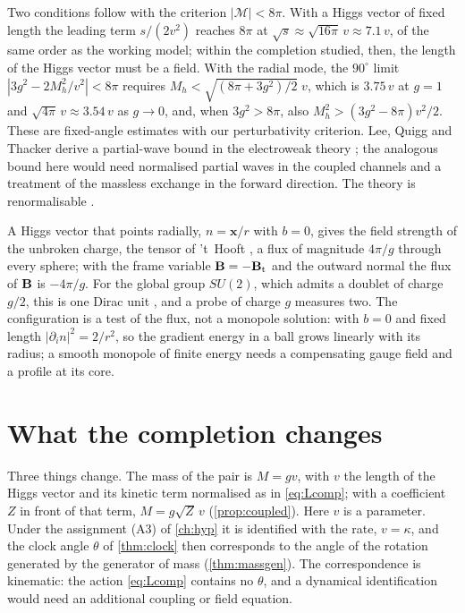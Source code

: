Two conditions follow with the criterion $|\mathcal M|<8\pi$. With a Higgs vector of fixed length the leading term $s/(2v^2)$ reaches $8\pi$
at $\sqrt s\approx\sqrt{16\pi}\,v\approx7.1\,v$, of the same order as the working model; within the completion studied, then, the length of the Higgs vector must be a field. With the
radial mode, the $90^\circ$ limit $|3g^2-2M_h^2/v^2|<8\pi$ requires $M_h<\sqrt{(8\pi+3g^2)/2}\;v$, which is $3.75\,v$ at $g=1$ and
$\sqrt{4\pi}\,v\approx3.54\,v$ as $g\to0$, and, when $3g^2>8\pi$, also $M_h^2>(3g^2-8\pi)v^2/2$. These are fixed-angle estimates with our
perturbativity criterion. Lee, Quigg and Thacker derive a partial-wave bound in the electroweak theory \cite{LeeQuiggThacker77}; the
analogous bound here would need normalised partial waves in the coupled channels and a treatment of the massless exchange in the forward
direction. The theory is renormalisable \cite{tHooft71}.

A Higgs vector that points radially, $n=\mathbf x/r$ with $b=0$, gives the field strength of the unbroken charge, the tensor of 't~Hooft
\cite{tHooft74,Polyakov74}, a flux of magnitude $4\pi/g$ through every sphere; with the frame variable $\mathbf B=-\mathbf B_{\rm t}$ and the outward normal
the flux of $\mathbf B$ is $-4\pi/g$. For the global group $SU(2)$, which admits a doublet of charge $g/2$, this is one Dirac unit \cite{Dirac31}, and a probe of charge $g$ measures two.
The configuration is a test of the flux, not a monopole solution: with $b=0$ and fixed length $|\partial_in|^2=2/r^2$, so the gradient
energy in a ball grows linearly with its radius; a smooth monopole of finite energy needs a compensating gauge field and a profile at its
core.

\section{What the completion changes}

Three things change. The mass of the pair is $M=gv$, with $v$ the length of the Higgs vector and its kinetic term normalised as in
\cref{eq:Lcomp}; with a coefficient $Z$ in front of that term, $M=g\sqrt Z\,v$ (\cref{prop:coupled}). Here $v$ is a parameter. Under the
assignment (A3) of \cref{ch:hyp} it is identified with the rate, $v=\kappa$, and the clock angle $\theta$ of \cref{thm:clock} then
corresponds to the angle of the rotation generated by the generator of mass (\cref{thm:massgen}). The correspondence is kinematic: the
action \cref{eq:Lcomp} contains no $\theta$, and a dynamical identification would need an additional coupling or field equation.


